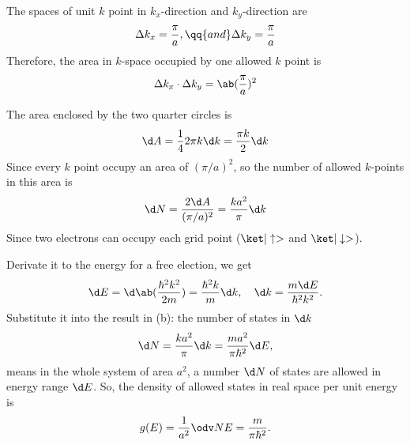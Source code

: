 \begin{solution}\leavevmode
  \begin{enumext}[label = (\alph*)]
    \item The spaces of unit $k$ point
    in $k_x$-direction and $k_y$-direction are
    \[
      \Delta k_x = \frac\pi a, \qq{and} \Delta k_y = \frac\pi a
    \]
    Therefore, the area in $k$-space occupied by one allowed $k$ point is
    \[
      \Delta k_x \cdot \Delta k_y = \ab(\frac\pi a)^2
    \]
    \item The area enclosed by the two quarter circles is
    \[
      \d A = \frac14 2\pi k \d k = \frac{\pi k}{2} \d k
    \]
    Since every $k$ point occupy an area of $(\pi/a)^2$,
    so the number of allowed $k$-points in this area is
    \[
      \d N = \frac{2\d A}{(\pi/a)^2} = \frac{ka^2}{\pi} \d k
    \]
    Since two electrons can occupy each grid point
    ($\ket|\uparrow>$ and $\ket|\downarrow>$).
    \item Derivate it to the energy for a free election, we get
    \[
      \d E = \d\ab(\frac{\hbar^2 k^2}{2m}) = \frac{\hbar^2k}{m} \d k,
      \quad \d k = \frac{m \d E}{\hbar^2 k^2}.
    \]
    Substitute it into the result in (b): the number of states in $\d k$
    \[
      \d N = \frac{ka^2}{\pi} \d k = \frac{ma^2}{\pi\hbar^2} \d E,
    \]
    means in the whole system of area $a^2$,
    a number $\d N$ of states are allowed in energy range $\d E$.
    So, the density of allowed states in real space per unit energy is
    \[
      g(E) = \frac1{a^2} \odv NE = \frac{m}{\pi\hbar^2}.
    \]
  \end{enumext}
\end{solution}

\clearpage

